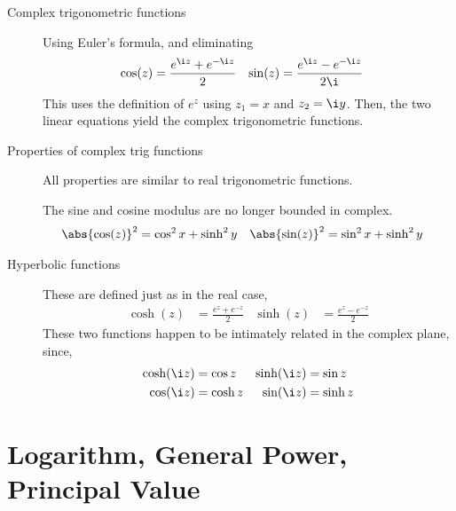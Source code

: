 \begin{description}
    \item[Complex trigonometric functions] Using Euler's formula, and eliminating
        \begin{align}
            \cos(z) & = \frac{e^{\i z} + e^{-\i z}}{2}   &
            \sin(z) & = \frac{e^{\i z} - e^{-\i z}}{2\i} &
        \end{align}
        This uses the definition of $ e^z $ using $ z_1 = x $ and $ z_2 = \i y $. Then,
        the two linear equations yield the complex trigonometric functions.

    \item[Properties of complex trig functions] All properties are similar to real
        trigonometric functions. \par
        The sine and cosine modulus are no longer bounded in complex.
        \begin{align}
            \abs{\cos(z)}^2 & = \cos^2 x + \sinh^2 y &
            \abs{\sin(z)}^2 & = \sin^2 x + \sinh^2 y
        \end{align}

    \item[Hyperbolic functions] These are defined just as in the real case,
        \begin{align}
            \cosh(z) & = \frac{e^z + e^{-z}}{2} &
            \sinh(z) & = \frac{e^z - e^{-z}}{2}
        \end{align}
        These two functions happen to be intimately related in the complex plane, since,
        \begin{align}
            \cosh(\i z) & = \cos z  &
            \sinh(\i z) & = \sin z    \\
            \cos(\i z)  & = \cosh z &
            \sin(\i z)  & = \sinh z
        \end{align}
\end{description}

\section{Logarithm, General Power, Principal Value}

